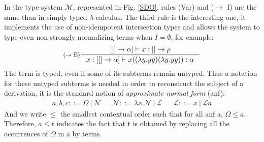 \documentclass{article}
\def\sysm{system $\mathcal{M}$}
\begin{document}
In the type \sysm, represented in Fig. \ref{SDO}, rules (Var) and ($\rightarrow$ I) are the same than in simply typed $\lambda$-calculus. The third rule is the interesting one, it implements the use of non-idempotent intersection types and allows the system to type even non-strongly normalizing terms when $I = \emptyset$, for example:
\begin{displaymath}
    \inference[($\rightarrow$ E)]{[[] \rightarrow \alpha] \vdash x : [] \rightarrow \rho}{x : [[] \rightarrow \alpha] \vdash x((\lambda y.yy)(\lambda y.yy)) : \alpha}
\end{displaymath}
The term is typed, even if some of its subterms remain untyped. Thus a notation for these untyped subterms is needed in order to reconstruct the subject of a derivation, it is the standard notion of \emph{approximate normal form} (anf):
\begin{align*}
    a,b,c ::= \Omega\ |\ \mathcal{N} 
    && \mathcal{N} ::= \lambda x.\mathcal{N}\ |\ \mathcal{L}
    && \mathcal{L} ::= x\ |\ \mathcal{L}a
\end{align*}
And we write $\leq$ the smallest contextual order such that for all anf a, $\Omega \leq a$. Therefore, $a \leq t$ indicates the fact that t is obtained by replacing all the occurrences of $\Omega$ in a by terms.
\end{document}

